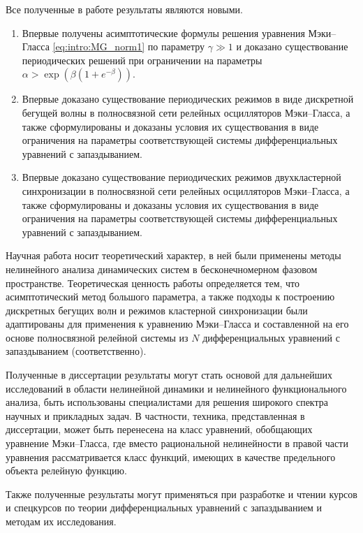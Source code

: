 \bigskip

{\novelty} Все полученные в работе результаты являются новыми. 
\begin{enumerate}[beginpenalty=10000] %
	\item Впервые получены асимптотические формулы решения уравнения Мэки--Гласса \eqref{eq:intro:MG_norm1} по параметру $\gamma \gg 1$ и доказано существование периодических решений при ограничении на параметры $\alpha > \exp\left(\beta(1 + e^{-\beta})\right)$.
	\item Впервые доказано существование периодических режимов в виде дискретной бегущей волны в полносвязной сети релейных осцилляторов Мэки--Гласса, а также сформулированы и доказаны условия их существования в виде ограничения на параметры соответствующей системы дифференциальных уравнений с запаздыванием.
	\item Впервые доказано существование периодических режимов двухкластерной синхронизации в полносвязной сети релейных осцилляторов Мэки--Гласса, а также сформулированы и доказаны условия их существования в виде ограничения на параметры соответствующей системы дифференциальных уравнений с запаздыванием.
\end{enumerate}

\bigskip

{\influence} Научная работа носит теоретический характер, в ней были применены методы нелинейного анализа динамических систем в бесконечномерном фазовом пространстве. Теоретическая ценность работы определяется тем, что асимптотический метод большого параметра, а также подходы к построению дискретных бегущих волн и режимов кластерной синхронизации были адаптированы для применения к уравнению Мэки--Гласса и составленной на его основе полносвязной релейной системы из $N$ дифференциальных уравнений с запаздыванием (соответственно).

Полученные в диссертации результаты могут стать основой для дальнейших исследований в области нелинейной динамики и нелинейного функционального анализа, быть использованы специалистами для решения широкого спектра научных и прикладных задач. В частности, техника, представленная в диссертации, может быть перенесена на класс уравнений, обобщающих уравнение Мэки--Гласса, где вместо рациональной нелинейности в правой части уравнения рассматривается класс функций, имеющих в качестве предельного объекта релейную функцию. 

Также полученные результаты могут применяться при разработке и чтении курсов и спецкурсов по теории дифференциальных уравнений с запаздыванием и методам их исследования.

